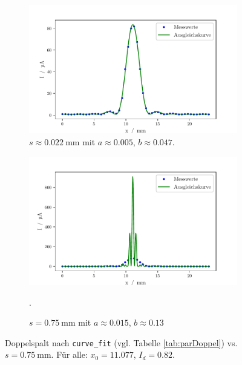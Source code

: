 \begin{figure}
    \centering
    \begin{subfigure}{.7\textwidth}
        \centering
        \includegraphics[width=.7\textwidth]{python/DoppelspaltFit.pdf}
        \caption{$s \approx \SI{0.022}{\milli\meter}$ mit $a \approx 0.005$, $b \approx 0.047$.}
        \label{fig:lsd3ss}
    \end{subfigure}%
    \begin{subfigure}{.7\textwidth}
        \centering
        \includegraphics[width=.7\linewidth]{python/DoppelspaltFits.pdf}
        \caption{$s = \SI{0.75}{\milli\meter}$ mit $a \approx 0.015$, $b \approx 0.13$}.
        \label{fig:lsd3s}
    \end{subfigure}
    \caption{Doppelspalt nach \texttt{curve\_fit} (vgl. Tabelle \ref{tab:parDoppel}) vs. $s = \SI{0.75}{\milli\meter}$. Für alle: $x_0 = 11.077$, $I_d = 0.82$.}
        \label{fig:ggn1}
    \end{figure}

